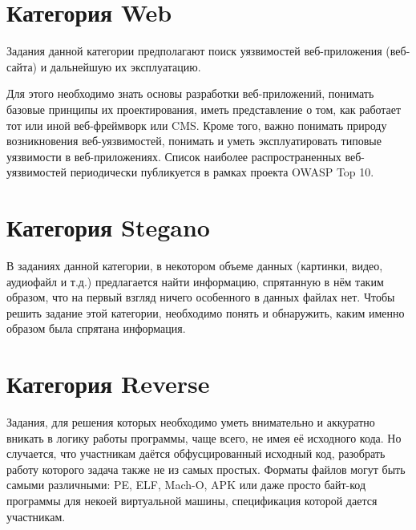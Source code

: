 

\section{Категория Web}

Задания данной категории предполагают поиск уязвимостей веб-приложения (веб-сайта) и дальнейшую их эксплуатацию.

Для этого необходимо знать основы разработки веб-приложений, понимать базовые принципы их проектирования, иметь представление о том, как работает тот или иной веб-фреймворк или CMS. Кроме того, важно понимать природу возникновения веб-уязвимостей, понимать и уметь эксплуатировать типовые уязвимости в веб-приложениях. Список наиболее распространенных веб-уязвимостей периодически публикуется в рамках проекта OWASP Top 10.
















\section{Категория Stegano}

В заданиях данной категории, в некотором объеме данных (картинки, видео, аудиофайл и т.д.) предлагается найти информацию, спрятанную в нём таким образом, что на первый взгляд ничего особенного в данных файлах нет. Чтобы решить задание этой категории, необходимо понять и обнаружить, каким именно образом была спрятана информация.





\section{Категория Reverse}

Задания, для решения которых необходимо уметь внимательно и аккуратно вникать в логику работы программы, чаще всего, не имея её исходного кода. Но случается, что участникам даётся обфусцированный исходный код, разобрать работу которого задача также не из самых простых. Форматы файлов могут быть самыми различными: PE, ELF, Mach-O, APK или даже просто байт-код программы для некоей виртуальной машины, спецификация которой дается участникам.

